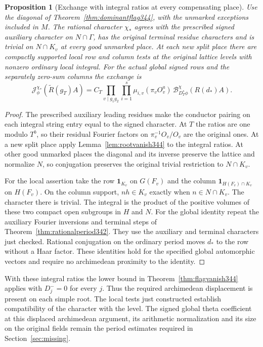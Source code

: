 \documentclass[a4paper,11pt]{article}
\newtheorem{proposition}{Proposition}[section]
\theoremstyle{definition}
\theoremstyle{remark}
\numberwithin{equation}{section}
\begin{document}
\begin{proposition}[Exchange with integral ratios at every compensating place]\leavevmode\label{prop:dominantexchange344}
Use the diagonal of Theorem~\ref{thm:dominantflag344}, with the
unmarked exceptions included in $M$. The rational character
$\chi_*$ agrees with the prescribed signed auxiliary character on
$N\cap\Gamma$, has the original terminal residue characters and
is trivial on $N\cap K_v$ at every good unmarked place.
At each new split place there are compactly supported local row
and column tests at the original lattice levels with nonzero
ordinary local integral. For the actual global signed rows and
the separately zero-sum columns the exchange is
\[
 \mathcal J^{\chi_*}_\phi(\widetilde R(g_T)A)
    =C_T\!\prod_{v\mid g_1g_2}\prod_{i=1}^s\mu_{i,v}(\pi_v O_v^a)
            \,\mathcal B^\chi_{D_T^s\phi}(R(d_*)A).
\]
\end{proposition}
\begin{proof}
The prescribed auxiliary leading residues make the conductor
pairing on each integral string entry equal to the signed
character. At $T$ the ratios are one modulo $T^b$, so their
residual Fourier factors on $\pi_v^{-1}O_v/O_v$ are the original
ones. At a new split place apply Lemma~\ref{lem:rootvanish344}
to the integral ratios. At other good unmarked places the diagonal
and its inverse preserve the lattice and normalize $N$, so
conjugation preserves the original trivial restriction to
$N\cap K_v$.

For the local assertion take the row $\mathbf1_{K_v}$ on $G(F_v)$
and the column $\mathbf1_{H(F_v)\cap K_v}$ on $H(F_v)$. On the
column support, $nh\in K_v$ exactly when $n\in N\cap K_v$.
The character there is trivial. The integral is the product of
the positive volumes of these two compact open subgroups in $H$
and $N$. For the global identity repeat the auxiliary Fourier
inversions and terminal steps of Theorem~\ref{thm:rationalperiod342}.
They use the auxiliary and terminal characters just checked.
Rational conjugation on the ordinary period moves $d_*$ to the
row without a Haar factor. These identities hold for the specified
global automorphic vectors and require no archimedean proximity
to the identity.
\end{proof}

With these integral ratios the lower bound in
Theorem~\ref{thm:flagvanish344} applies with $D_j^-=0$ for
every $j$. Thus the required archimedean displacement is present
on each simple root. The local tests just constructed establish
compatibility of the character with the level. The signed global
theta coefficient at this displaced archimedean argument, its
arithmetic normalization and its size on the original fields
remain the period estimates required in Section~\ref{sec:missing}.
\end{document}

